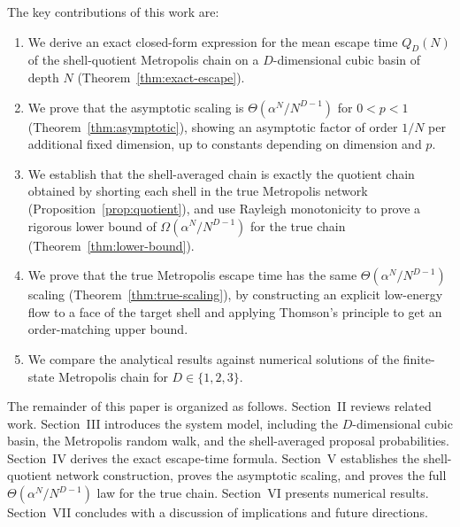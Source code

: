 \documentclass[conference]{IEEEtran}
\DeclareRobustCommand{\revfiveadd}[1]{{\color{revisionpurple}#1}}
\begin{document}
The key contributions of this work are:
\begin{enumerate}
\item We derive an exact closed-form expression for the mean escape time
$Q_D(N)$ of the shell-quotient Metropolis chain on a $D$-dimensional
cubic basin of depth $N$ (Theorem~\ref{thm:exact-escape}).
\item We prove that the asymptotic scaling is
$\Theta(\alpha^N / N^{D-1})$ for $0<p<1$ (Theorem~\ref{thm:asymptotic}),
showing an asymptotic factor of order $1/N$ per additional fixed
dimension, up to constants depending on dimension and $p$.
\item We establish that the shell-averaged chain is exactly the quotient
chain obtained by shorting each shell in the true Metropolis network
(Proposition~\ref{prop:quotient}), and use Rayleigh monotonicity to prove
a rigorous lower bound of $\Omega(\alpha^N/N^{D-1})$ for the true chain
(Theorem~\ref{thm:lower-bound}).
\item We prove that the true Metropolis escape time has the same
$\Theta(\alpha^N/N^{D-1})$ scaling (Theorem~\ref{thm:true-scaling}),
by constructing an explicit low-energy flow to a face of the target
shell and applying Thomson's principle to get an order-matching upper bound.
\item We compare the analytical results against numerical solutions of the finite-state Metropolis chain for $D \in \{1, 2, 3\}$.
\end{enumerate}

The remainder of this paper is organized as follows.
Section~II reviews related work.
Section~III introduces the system model, including the $D$-dimensional
cubic basin, the Metropolis random walk, and the shell-averaged proposal
probabilities.
Section~IV derives the exact escape-time formula.
Section~V establishes the shell-quotient network construction, proves the asymptotic
scaling, and proves the full $\Theta(\alpha^N/N^{D-1})$ law for the true chain.
Section~VI presents numerical results.
Section~VII concludes with a discussion of implications and future directions.
\end{document}
